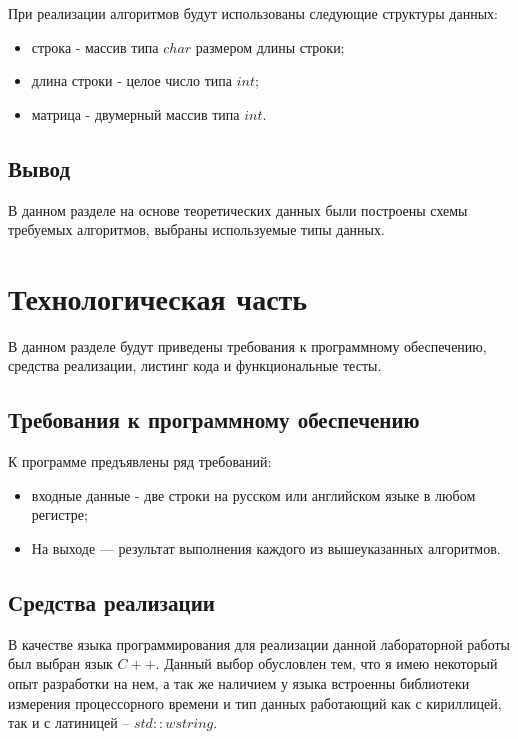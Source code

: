 \documentclass[a4paper,14pt, unknownkeysallowed]{bmstu}
\begin{document}
При реализации алгоритмов будут использованы следующие структуры данных:

\begin{itemize}
	\item строка - массив типа $char$ размером длины строки;
	\item длина строки - целое число типа $int$;
	\item матрица - двумерный массив типа $int$.
\end{itemize}

\section{Вывод}

В данном разделе на основе теоретических данных были построены схемы
требуемых алгоритмов, выбраны используемые типы данных.

\chapter{Технологическая часть}

В данном разделе будут приведены требования к программному обеспечению, средства реализации, листинг кода и функциональные тесты.

\section{Требования к программному обеспечению}

К программе предъявлены ряд требований:

\begin{itemize}
	\item входные данные - две строки на русском или английском языке в любом
регистре;
    \item На выходе — результат выполнения каждого из вышеуказанных алгоритмов.
\end{itemize}

\section{Средства реализации}

В качестве языка программирования для реализации данной лабораторной работы был выбран язык $C++$. Данный выбор обусловлен тем,
что я имею некоторый опыт разработки на нем, а так же наличием у языка
встроенны библиотеки измерения процессорного времени и тип данных работающий как с кириллицей, так и с латиницей -- $std::wstring$.
\end{document}
